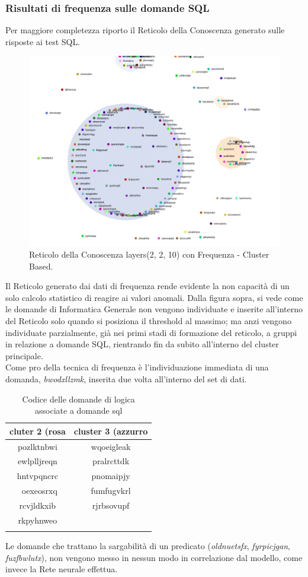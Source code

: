 \subsubsection{Risultati di frequenza sulle domande SQL}
\label{Risultati di frequenza sulle domande SQL}
Per maggiore completezza riporto il Reticolo della Conoscenza generato sulle risposte ai test SQL.
\begin{figure}[H]
\centering
	\includegraphics[width=0.70\linewidth]{./image/frequence-sql(2,2,10).png}
	\caption{Reticolo della Conoscenza layers(2, 2, 10) con Frequenza - Cluster Based.}
	\label{Reticolo della Conoscenza layers(2, 2, 10) con Frequenza - Cluster Based.}
\end{figure}
\noindent
Il Reticolo generato dai dati di frequenza rende evidente la non capacità di un solo calcolo statistico di reagire ai valori anomali. Dalla figura sopra, si vede come  le domande di Informatica Generale non vengono individuate e inserite all'interno del Reticolo solo quando si posiziona il threshold al massimo; ma anzi vengono individuate parzialmente, già nei primi stadi di formazione del reticolo, a gruppi in relazione a domande SQL, rientrando fin da subito all'interno del cluster principale.\\
\noindent
Come pro della tecnica di frequenza è l'individuazione immediata di una domanda, \textit{bwodxllzmk}, inserita due volta all'interno del set di dati.

\begin{longtable}{|c|c|}
	\hline
	\textbf{cluter 2 (rosa} & \textbf{cluster 3 (azzurro} \\\hline\hline
	pozlktnbwi & wqoeigleak \\
	ewlplljreqn & pralrcttdk \\
	hntvpqncrc & pnomaipjy \\\
	oexeosrxq & fumfugvkrl \\
	rcvjldkxib & rjrbsovupf \\
    rkpyhnweo & \\
\hline	
\caption{Codice delle domande di logica associate a domande sql}\label{tab:Codice delle domande di logica associate a domande sql}
\end{longtable}
\noindent
Le domande che trattano la sargabilità di un predicato  (\textit{oldnuetsfx}, \textit{fyrpicjgan}, \textit{fuzfbwlutx}), non vengono messo in nessun modo in correlazione dal modello, come invece la Rete neurale effettua.
	
	









